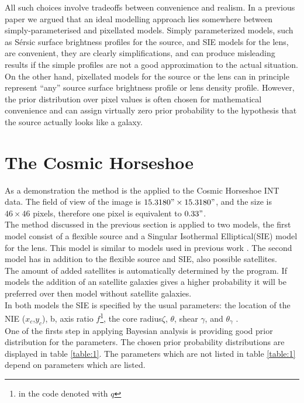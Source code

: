 \documentclass[useAMS,usenatbib]{mn2e}
\begin{document}
All such choices involve tradeoffs between convenience and realism.
In a previous paper \citep{2011MNRAS.412.2521B} we argued that an ideal
modelling approach lies somewhere between simply-parameterised and
pixellated models. Simply parameterized models, such as Sérsic surface
brightness profiles for the source, and SIE models for the lens, are convenient,
they are clearly simplifications, and can produce misleading results if the
simple profiles are not a good approximation to the actual situation. On the
other hand, pixellated models for the source \citep[e.g.][]{suyu} or the lens
\citep[e.g.][]{2014MNRAS.445.2181C} can in principle represent ``any''
source surface brightness profile or lens density profile. However, the prior
distribution over pixel values is often chosen for mathematical convenience
\citep{2003ApJ...590..673W} and can assign virtually zero prior probability
to the hypothesis that the source actually looks like a galaxy.



\section{The Cosmic Horseshoe}
As a demonstration the method is the applied to the Cosmic Horseshoe INT data. 
The field of view of the image is $15.3180" \times 15.3180"$, and the size is $46 \times 46$ pixels, therefore one pixel is equivalent to $0.33"$. \\
The method discussed  in the previous section is applied to two models, the first model consist of a flexible source and a Singular Isothermal Elliptical(SIE) model for the lens.  This model is similar to models used in previous work \cite{Belokurov2007} \cite{Dye2008}. 
The second model has in addition to the flexible source and SIE, also possible satellites. \\
The amount of added satellites is automatically determined by the program. If models the addition of an satellite galaxies gives a higher probability it will be preferred over then model without satellite galaxies.  \\
In both models the SIE is specified by the usual parameters: the location of the NIE ($x_c$,$y_c$), b, axis ratio $f$\footnote{in the code denoted with $q$},  the core radius$\zeta$, $\theta$, shear $\gamma$, and $\theta_{\gamma}$ \cite{kormann_schneider_1994}.\\
One of the firsts step in applying Bayesian analysis is providing good prior distribution for the parameters. 
The chosen prior probability distributions are displayed in table \ref{table:1}. The parameters which are not listed in table 
\ref{table:1} depend on parameters which are listed. 
\end{document}
